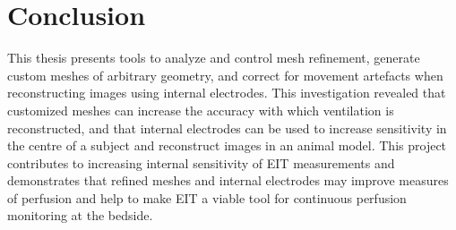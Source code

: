 \section{Conclusion}
This thesis presents tools to analyze and control mesh refinement, generate custom meshes 
of arbitrary geometry, and correct for movement artefacts when reconstructing images using 
internal electrodes. This investigation revealed that customized meshes can increase
the accuracy with which ventilation is reconstructed, and that internal electrodes can be used to increase sensitivity 
in the centre of a subject and reconstruct images in an animal model.  
This project contributes to increasing internal sensitivity of 
EIT measurements and demonstrates that refined meshes and internal 
electrodes may improve measures of perfusion and help to make EIT a 
viable tool for continuous perfusion monitoring at the bedside.




%
%
%
%
%